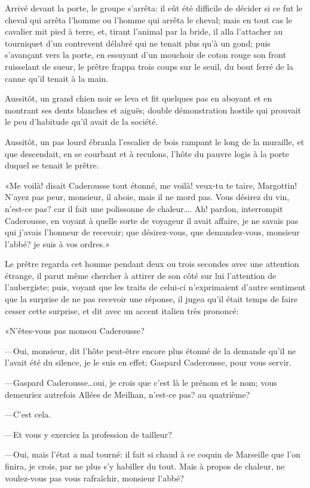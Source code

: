 Arrivé devant la porte, le groupe s'arrêta: il eût été difficile de décider si ce fut le cheval qui arrêta l'homme ou l'homme qui arrêta le cheval; mais en tout cas le cavalier mit pied à terre, et, tirant l'animal par la bride, il alla l'attacher au tourniquet d'un contrevent délabré qui ne tenait plus qu'à un gond; puis s'avançant vers la porte, en essuyant d'un mouchoir de coton rouge son front ruisselant de sueur, le prêtre frappa trois coups sur le seuil, du bout ferré de la canne qu'il tenait à la main.

Aussitôt, un grand chien noir se leva et fit quelques pas en aboyant et en montrant ses dents blanches et aiguës; double démonstration hostile qui prouvait le peu d'habitude qu'il avait de la société.

Aussitôt, un pas lourd ébranla l'escalier de bois rampant le long de la muraille, et que descendait, en se courbant et à reculons, l'hôte du pauvre logis à la porte duquel se tenait le prêtre.

«Me voilà! disait Caderousse tout étonné, me voilà! veux-tu te taire, Margottin! N'ayez pas peur, monsieur, il aboie, mais il ne mord pas. Vous désirez du vin, n'est-ce pas? car il fait une polissonne de chaleur\dots. Ah! pardon, interrompit Caderousse, en voyant à quelle sorte de voyageur il avait affaire, je ne savais pas qui j'avais l'honneur de recevoir; que désirez-vous, que demandez-vous, monsieur l'abbé? je suis à vos ordres.»

Le prêtre regarda cet homme pendant deux ou trois secondes avec une attention étrange, il parut même chercher à attirer de son côté sur lui l'attention de l'aubergiste; puis, voyant que les traits de celui-ci n'exprimaient d'autre sentiment que la surprise de ne pas recevoir une réponse, il jugea qu'il était temps de faire cesser cette surprise, et dit avec un accent italien très prononcé:

«N'êtes-vous pas monsou Caderousse?

—Oui, monsieur, dit l'hôte peut-être encore plus étonné de la demande qu'il ne l'avait été du silence, je le suis en effet; Gaspard Caderousse, pour vous servir.

—Gaspard Caderousse\dots oui, je crois que c'est là le prénom et le nom; vous demeuriez autrefois Allées de Meilhan, n'est-ce pas? au quatrième?

—C'est cela.

—Et vous y exerciez la profession de tailleur?

—Oui, mais l'état a mal tourné: il fait si chaud à ce coquin de Marseille que l'on finira, je crois, par ne plus s'y habiller du tout. Mais à propos de chaleur, ne voulez-vous pas vous rafraîchir, monsieur l'abbé?

